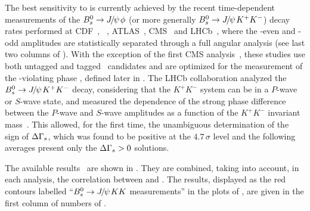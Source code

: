 
The best sensitivity to \DGs is currently achieved 
by the recent time-dependent measurements
of the $B^0_s\to{J\mskip -3mu/\mskip -2mu\psi\mskip 2mu}\phi$ (or more generally $B^0_s\to{J\mskip -3mu/\mskip -2mu\psi\mskip 2mu} K^+K^-$) decay rates performed at
CDF~\cite{Aaltonen:2012ie,*CDF:2011af,*Aaltonen:2007he_mod,*Aaltonen:2007gf_mod},
\dzero~\cite{Abazov:2011ry,*Abazov_mod:2008fj,*Abazov:2007tx_mod_cont}, 
ATLAS~\cite{Aad:2014cqa,*Aad:2012kba_cont}, CMS~\cite{CMS-PAS-BPH-11-006,CMS-PAS-BPH-13-012}
and LHCb~\cite{LHCB-PAPER-2014-059,*Aaij:2013oba_supersede2},
where the \CP-even and \CP-odd
amplitudes are statistically separated through a full angular analysis
(see last two columns of ). 
With the exception of the first CMS analysis~\cite{CMS-PAS-BPH-11-006},
these studies use both untagged and tagged \Bs\ candidates and 
are optimized for the measurement of the \CP-violating 
phase \phiccbars, defined later in .
The LHCb collaboration analyzed the $B^0_s \to {J\mskip -3mu/\mskip -2mu\psi\mskip 2mu} K^+K^-$
decay, considering that the $K^+K^-$ system can be in a $P$-wave or $S$-wave state, 
and measured the dependence of the strong phase difference between the 
$P$-wave and $S$-wave amplitudes as a function of the $K^+K^-$ invariant
mass~\cite{Aaij:2012eq}. 
This allowed, for the first time, the unambiguous determination of the sign of 
$\Delta\Gamma_{s}$, which was found to be positive at the $4.7\,\sigma$ level and the
following averages present only the $\Delta\Gamma_{s} > 0$ solutions.


The available results~\cite{Aaltonen:2012ie,*CDF:2011af,*Aaltonen:2007he_mod,*Aaltonen:2007gf_mod,Abazov:2011ry,*Abazov_mod:2008fj,*Abazov:2007tx_mod_cont,Aad:2014cqa,*Aad:2012kba_cont,CMS-PAS-BPH-11-006,CMS-PAS-BPH-13-012,LHCB-PAPER-2014-059,*Aaij:2013oba_supersede2}
are shown in . They are combined, taking into account, in each analysis, the correlation between \DGs and \Gs.
The results, displayed as the red contours labelled ``$B^0_s \to {J\mskip -3mu/\mskip -2mu\psi\mskip 2mu} KK$ measurements'' in the
plots of , are given in the first column of numbers of .

